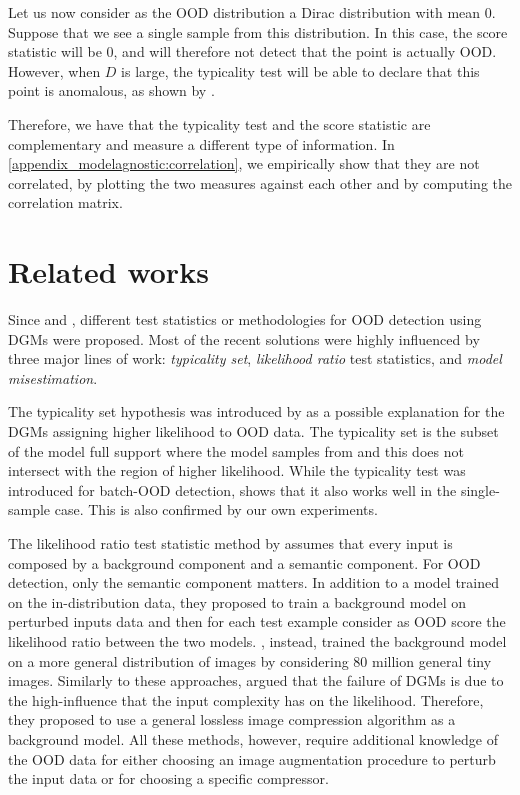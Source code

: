 {Let us now consider as the OOD distribution a Dirac distribution with mean $0$. Suppose that we see a single sample from this distribution. In this case, the score statistic will be $0$, and will therefore not detect that the point is actually OOD. However, when $D$ is large, the typicality test will be able to declare that this point is anomalous, as shown by \textcite{nalisnick_detecting_2019}.

Therefore, we have that the typicality test and the score statistic are complementary and measure a different type of information. In \cref{appendix_modelagnostic:correlation}, we empirically show that they are not correlated, by plotting the two measures against each other and by computing the correlation matrix.



\section{Related works}
\label{sec_modelagnostic:related_works}

Since \textcite{nalisnick_deep_2019} and \textcite{hendrycks_deep_2019}, different test statistics or methodologies for OOD detection using DGMs were proposed. Most of the recent solutions were highly influenced by three major lines of work: \emph{typicality set}, \emph{likelihood ratio} test statistics, and \emph{model misestimation}. 

The typicality set hypothesis was introduced by \textcite{nalisnick_detecting_2019} as a possible explanation for the DGMs assigning higher likelihood to OOD data. The typicality set is the subset of the model full support where the model samples from and this does not intersect with the region of higher likelihood. While the typicality test was introduced for batch-OOD detection, \textcite{morningstar_density_2021} shows that it also works well in the single-sample case. This is also confirmed by our own experiments. 

The likelihood ratio test statistic method by \textcite{ren_likelihood_2019} assumes that every input is composed by a background component and a semantic component. For OOD detection, only the semantic component matters. In addition to a model trained on the in-distribution data, they proposed to train a background model on perturbed inputs data and then for each test example consider as OOD score the likelihood ratio between the two models. \textcite{schirrmeister_understanding_2020}, instead, trained the background model on a more general distribution of images by considering 80 million general tiny images. Similarly to these approaches, \textcite{serra_input_2020} argued that the failure of DGMs is due to the high-influence that the input complexity has on the likelihood. Therefore, they proposed to use a general lossless image compression algorithm as a background model.
All these methods, however, require additional knowledge of the OOD data for either choosing an image augmentation procedure to perturb the input data or for choosing a specific compressor. 

}
